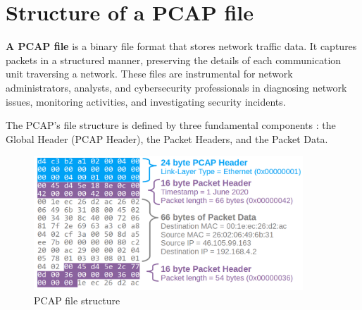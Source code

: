 \pagebreak
\section{Structure of a PCAP file}
\textbf{A PCAP file} is a binary file format that stores network traffic data. It captures packets in a structured manner, preserving the details of each communication unit traversing a network. These files are instrumental for network administrators, analysts, and cybersecurity professionals in diagnosing network issues, monitoring activities, and investigating security incidents.


The PCAP's file structure is defined by three fundamental components : the Global Header (PCAP Header), the Packet Headers, and the Packet Data.
\begin{figure}[h]
	\centering
	\includegraphics[width=0.9\textwidth]{./assets/images/PCAP-header-hex_1040x520.png}
	\caption{PCAP file structure}
\end{figure}










